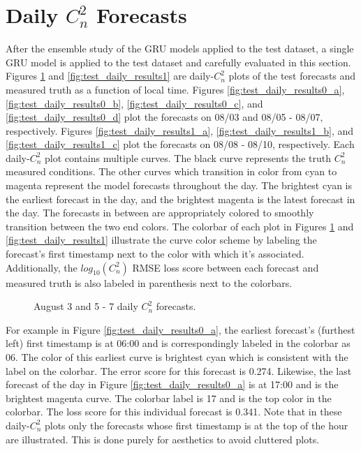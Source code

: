 \section{Daily $C_{n}^{2}$ Forecasts}
\label{sec:daily_cn2_forecasts}
After the ensemble study of the GRU models applied to the test dataset, a single GRU model is applied to the test dataset and carefully evaluated in this section. Figures \ref{fig:test_daily_results0} and \ref{fig:test_daily_results1} are daily-$C_{n}^{2}$ plots of the test forecasts and measured truth as a function of local time. Figures \ref{fig:test_daily_results0_a}, \ref{fig:test_daily_results0_b}, \ref{fig:test_daily_results0_c}, and \ref{fig:test_daily_results0_d} plot the forecasts on 08/03 and 08/05 - 08/07, respectively.  Figures \ref{fig:test_daily_results1_a}, \ref{fig:test_daily_results1_b}, and \ref{fig:test_daily_results1_c} plot the forecasts on 08/08 - 08/10, respectively. Each daily-$C_{n}^{2}$ plot contains multiple curves. The black curve represents the truth $C_{n}^{2}$ measured conditions. The other curves which transition in color from cyan to magenta represent the model forecasts throughout the day. The brightest cyan is the earliest forecast in the day, and the brightest magenta is the latest forecast in the day. The forecasts in between are appropriately colored to smoothly transition between the two end colors. The colorbar of each plot in Figures \ref{fig:test_daily_results0} and \ref{fig:test_daily_results1} illustrate the curve color scheme by labeling the forecast's first timestamp next to the color with which it's associated. Additionally, the $log_{10}(C_{n}^{2})$ RMSE loss score between each forecast and measured truth is also labeled in parenthesis next to the colorbars.
\begin{figure}[h!]
	\centering
	\hfill
	\hfill
	\caption{August 3 and 5 - 7 daily $C_{n}^{2}$ forecasts.}
	\label{fig:test_daily_results0}
\end{figure}
For example in Figure \ref{fig:test_daily_results0_a}, the earliest forecast's (furthest left) first timestamp is at 06:00 and is correspondingly labeled in the colorbar as 06. The color of this earliest curve is brightest cyan which is consistent with the label on the colorbar. The error score for this forecast is 0.274. Likewise, the last forecast of the day in Figure \ref{fig:test_daily_results0_a} is at 17:00 and is the brightest magenta curve. The colorbar label is 17 and is the top color in the colorbar. The loss score for this individual forecast is 0.341. Note that in these daily-$C_{n}^{2}$ plots only the forecasts whose first timestamp is at the top of the hour are illustrated. This is done purely for aesthetics to avoid cluttered plots.

